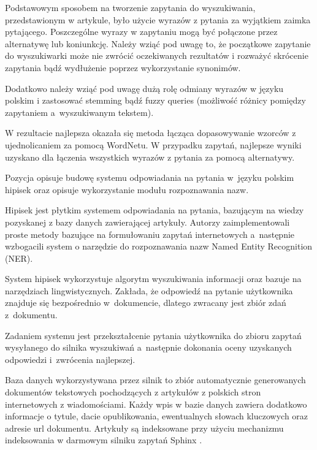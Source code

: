 Podstawowym sposobem na tworzenie zapytania do wyszukiwania, przedstawionym w artykule, było użycie wyrazów z pytania za wyjątkiem zaimka pytającego. Poszczególne wyrazy w zapytaniu mogą być połączone przez alternatywę lub koniunkcję. Należy wziąć pod uwagę to, że początkowe zapytanie do wyszukiwarki może nie zwrócić oczekiwanych rezultatów i rozważyć skrócenie zapytania bądź wydłużenie poprzez wykorzystanie synonimów. 

Dodatkowo należy wziąć pod uwagę dużą rolę odmiany wyrazów w języku polskim i zastosować stemming bądź fuzzy queries (możliwość różnicy pomiędzy zapytaniem a~wyszukiwanym tekstem).

W rezultacie najlepsza okazała się metoda łącząca dopasowywanie wzorców z ujednolicaniem za pomocą WordNetu. W przypadku zapytań, najlepsze wyniki uzyskano dla łączenia wszystkich wyrazów z pytania za pomocą alternatywy\cite{przybyla-2013-question}. 

Pozycja \cite{polishQAS} opisuje budowę systemu odpowiadania na pytania w~języku polskim hipisek oraz opisuje wykorzystanie modułu rozpoznawania nazw.

Hipisek jest płytkim systemem odpowiadania na pytania, bazującym na wiedzy pozyskanej z bazy danych zawierającej artykuły. Autorzy zaimplementowali proste metody bazujące na formułowaniu zapytań internetowych a~następnie wzbogacili system o narzędzie do rozpoznawania nazw Named Entity Recognition (NER). 

System hipisek wykorzystuje algorytm wyszukiwania informacji oraz bazuje na narzędziach lingwistycznych. Zakłada, że odpowiedź na pytanie użytkownika znajduje się bezpośrednio w~dokumencie, dlatego zwracany jest zbiór zdań z~dokumentu.

Zadaniem systemu jest przekształcenie pytania użytkownika do zbioru zapytań wysyłanego do silnika wyszukiwań a~następnie dokonania oceny uzyskanych odpowiedzi i~zwrócenia najlepszej.

Baza danych wykorzystywana przez silnik to zbiór automatycznie generowanych dokumentów tekstowych pochodzących z artykułów z polskich stron internetowych z wiadomościami. Każdy wpis w bazie danych zawiera dodatkowo informacje o tytule, dacie opublikowania, ewentualnych słowach kluczowych oraz adresie url dokumentu. Artykuły są indeksowane przy użyciu mechanizmu indeksowania w darmowym silniku zapytań Sphinx \cite{sphinx}. 

